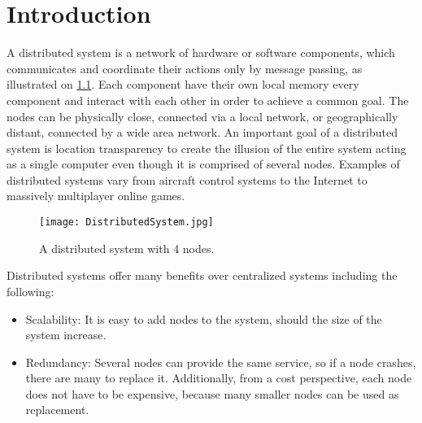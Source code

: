 \chapter{Introduction}


A distributed system is a network of hardware or software components, which communicates and coordinate their actions only by message passing\cite{coulouris2005distributed}, as illustrated on \cref{fig:distributedSystem}. Each component have their own local memory every component and interact with each other in order to achieve a common goal. The nodes can be physically close, connected via a local network, or geographically distant, connected by a wide area network. An important goal of a distributed system is location transparency\cite{coulouris2005distributed} to create the illusion of the entire system acting as a single computer even though it is comprised of several nodes. Examples of distributed systems vary from aircraft control systems to the Internet to massively multiplayer online games. 

\begin{figure}
	\centering
	\texttt{[image: DistributedSystem.jpg]} 
	\caption[Distributed Computing System with 2 nodes]{
		\label{fig:distributedSystem} 
		\footnotesize{%
			A distributed system with 4 nodes.
		}
	}
\end{figure}

Distributed systems offer many benefits over centralized systems including the following\cite{IBM2005TXSeries}:
\begin{itemize}
	\item Scalability: It is easy to add nodes to the system, should the size of the system increase.
	\item Redundancy: Several nodes can provide the same service, so if a node crashes, there are many to replace it. Additionally, from a cost perspective, each node does not have to be expensive, because many smaller nodes can be used as replacement.
\end{itemize}

